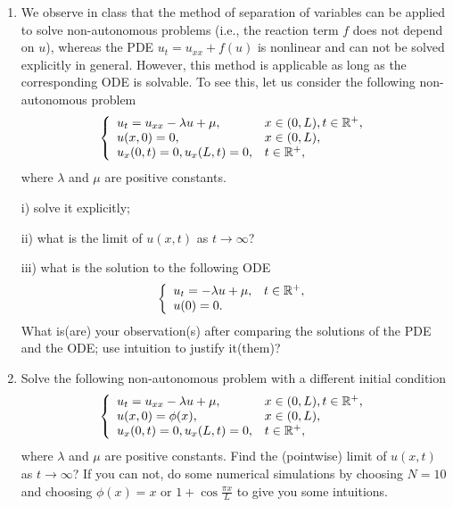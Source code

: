 \documentclass[6pt]{article}
\numberwithin{equation}{section}
\def\mathbb{\Bbb}
\begin{document}
\begin{enumerate}
\item  We observe in class that the method of separation of variables can be applied to solve non-autonomous problems (i.e., the reaction term $f$ does not depend on $u$), whereas the PDE $u_t=u_{xx}+f(u)$ is nonlinear and can not be solved explicitly in general.  However, this method is applicable as long as the corresponding ODE is solvable.  To see this, let us consider the following non-autonomous problem
\begin{equation}\label{5}
\left\{
\begin{array}{ll}
u_t=u_{xx}-\lambda u+\mu,& x\in(0,L),t\in\mathbb R^+,\\
u(x,0)=0,&x\in(0,L),\\
u_x(0,t)=0, u_x(L,t)=0, &t\in\mathbb R^+,
\end{array}
\right.
\end{equation}
where $\lambda$ and $\mu$ are positive constants.

i) solve it explicitly;

ii) what is the limit of $u(x,t)$ as $t\rightarrow \infty$?

iii) what is the solution to the following ODE
\begin{equation}
\left\{
\begin{array}{ll}
u_t=-\lambda u+\mu,&t\in\mathbb R^+,\\
u(0)=0.&
\end{array}
\right.
\end{equation}
What is(are) your observation(s) after comparing the solutions of the PDE and the ODE; use intuition to justify it(them)?

\item  Solve the following non-autonomous problem with a different initial condition
\begin{equation}\label{5a}
\left\{
\begin{array}{ll}
u_t=u_{xx}-\lambda u+\mu,& x\in(0,L),t\in\mathbb R^+,\\
u(x,0)=\phi(x),&x\in(0,L),\\
u_x(0,t)=0, u_x(L,t)=0, &t\in\mathbb R^+,
\end{array}
\right.
\end{equation}
where $\lambda$ and $\mu$ are positive constants.  Find the (pointwise) limit of $u(x,t)$ as $t\rightarrow\infty$?  If you can not, do some numerical simulations by choosing $N=10$ and choosing $\phi(x)=x$ or $1+\cos \frac{\pi x}{L}$ to give you some intuitions.
\end{enumerate}
\end{document}
